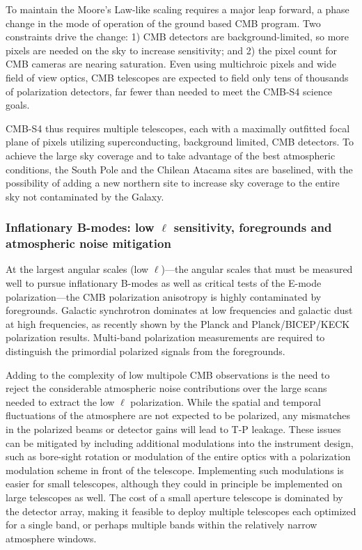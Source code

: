 To maintain the Moore's Law-like scaling requires a major leap forward, a phase change in the mode of operation of the ground based CMB program.  Two constraints drive the change:  1) CMB detectors are background-limited, so more pixels are needed on the sky to increase sensitivity; and 2) the pixel count for CMB cameras are nearing saturation.  Even using multichroic pixels and wide field of view optics, CMB telescopes are expected to field only tens of thousands of polarization detectors, far fewer than needed to meet the CMB-S4 science goals. 

CMB-S4 thus requires multiple telescopes, each with a maximally outfitted focal plane of pixels utilizing superconducting, background limited, CMB detectors. To achieve the large sky coverage and to take advantage of the best atmospheric conditions, the South Pole and the Chilean Atacama sites are baselined, with the possibility of adding a new northern site to increase sky coverage to the entire sky not contaminated by the Galaxy.

\subsubsection{Inflationary B-modes: low $\ell$ sensitivity, foregrounds and atmospheric noise mitigation}

At the largest angular scales (low $\ell$)---the angular scales that must be measured well to pursue inflationary B-modes as well as critical tests of the E-mode polarization---the CMB polarization anisotropy is highly contaminated by foregrounds. Galactic synchrotron dominates at low frequencies and galactic dust at high frequencies, as recently shown by the Planck and Planck/BICEP/KECK polarization results. Multi-band polarization measurements are required to distinguish the primordial polarized signals from the foregrounds. 

Adding to the complexity of low multipole CMB observations is the need to reject the considerable atmospheric noise contributions over the large scans needed to extract the low 
$\ell$ polarization. While the spatial and temporal fluctuations of the atmosphere are not expected to be polarized, any mismatches in the polarized beams or detector gains will lead to T-P leakage. These issues can be mitigated by including additional modulations into the instrument design, such as bore-sight rotation or modulation of the entire optics with a polarization modulation scheme in front of the telescope. Implementing such modulations is easier for small telescopes, although they could in principle be implemented on large telescopes as well. The cost of a small aperture telescope is dominated by the detector array, making it feasible to deploy multiple telescopes each optimized for a single band, or perhaps multiple bands within the relatively narrow atmosphere windows.

